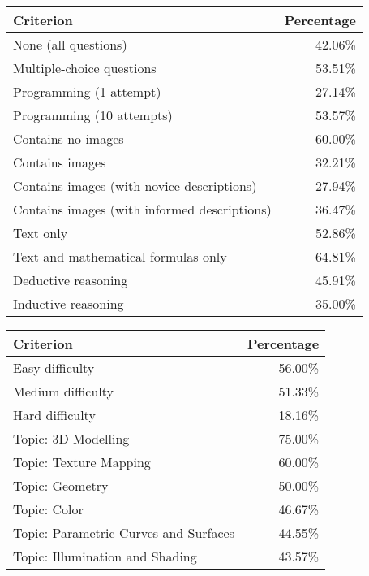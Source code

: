 \documentclass[sigconf,authordraft]{acmart}
\begin{document}
\begin{table*}
    \centering
    \caption{The percentages of correct generated solutions by criteria}
    \label{Percentage}
    \begin{tabular}{|l|r|}
    \hline
        \multicolumn{1}{|p{6cm}|}{Criterion} & Percentage \\ \hline
        \hline
        None (all questions) & 42.06\% \\ \hline
        \hline
        Multiple-choice questions & 53.51\% \\ \hline
        Programming (1 attempt)& 27.14\% \\ \hline
        Programming (10 attempts) & 53.57\% \\ \hline
        \hline
        Contains no images & 60.00\% \\ \hline
        Contains images & 32.21\% \\ \hline
        Contains images (with novice descriptions) & 27.94\% \\ \hline
        Contains images (with informed descriptions) & 36.47\% \\ \hline
        \hline
        Text only & 52.86\% \\ \hline
        Text and mathematical formulas only & 64.81\% \\ \hline
        \hline
        Deductive reasoning & 45.91\% \\ \hline
        Inductive reasoning & 35.00\% \\ \hline
    \end{tabular}
    \;
    \begin{tabular}{|l|r|}
        \hline
        \multicolumn{1}{|p{6cm}|}{Criterion} & Percentage \\ \hline
        \hline
        Easy difficulty & 56.00\% \\ \hline
        Medium difficulty & 51.33\% \\ \hline
        Hard difficulty & 18.16\% \\ \hline
        \hline
        Topic: 3D Modelling & 75.00\% \\ \hline
        Topic: Texture Mapping & 60.00\% \\ \hline
        Topic: Geometry & 50.00\% \\ \hline
        Topic: Color & 46.67\% \\ \hline
        Topic: Parametric Curves and Surfaces & 44.55\% \\ \hline
        Topic: Illumination and Shading & 43.57\% \\ \hline

\end{tabular}
\end{table*}
\end{document}
